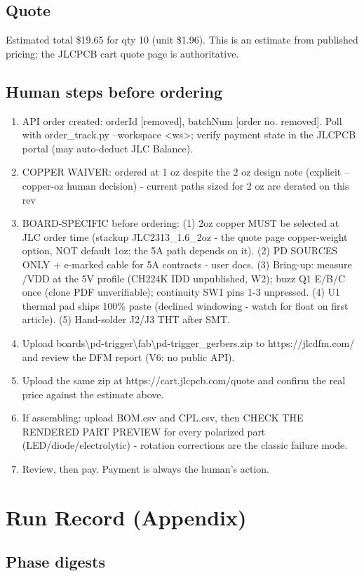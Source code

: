 \documentclass[11pt,a4paper]{article}
\begin{document}
\subsection*{Quote}
Estimated total \$19.65 for qty 10 (unit \$1.96). This is an estimate from published pricing; the JLCPCB cart quote page is authoritative.
\subsection*{Human steps before ordering}
\begin{enumerate}
\item API order created: orderId [removed], batchNum [order no. removed]. Poll with order\_track.py --workspace \textless{}ws\textgreater{}; verify payment state in the JLCPCB portal (may auto-deduct JLC Balance).
\item COPPER WAIVER: ordered at 1 oz despite the 2 oz design note (explicit --copper-oz human decision) - current paths sized for 2 oz are derated on this rev
\item BOARD-SPECIFIC before ordering: (1) 2oz copper MUST be selected at JLC order time (stackup JLC2313\_1.6\_2oz - the quote page copper-weight option, NOT default 1oz; the 5A path depends on it). (2) PD SOURCES ONLY + e-marked cable for 5A contracts - user docs. (3) Bring-up: measure /VDD at the 5V profile (CH224K IDD unpublished, W2); buzz Q1 E/B/C once (clone PDF unverifiable); continuity SW1 pins 1-3 unpressed. (4) U1 thermal pad ships 100\% paste (declined windowing - watch for float on first article). (5) Hand-solder J2/J3 THT after SMT.
\item Upload boards\textbackslash{}pd-trigger\textbackslash{}fab\textbackslash{}pd-trigger\_gerbers.zip to https://jlcdfm.com/ and review the DFM report (V6: no public API).
\item Upload the same zip at https://cart.jlcpcb.com/quote and confirm the real price against the estimate above.
\item If assembling: upload BOM.csv and CPL.csv, then CHECK THE RENDERED PART PREVIEW for every polarized part (LED/diode/electrolytic) - rotation corrections are the classic failure mode.
\item Review, then pay. Payment is always the human's action.
\end{enumerate}
\section{Run Record (Appendix)}
\subsection*{Phase digests}
\end{document}

